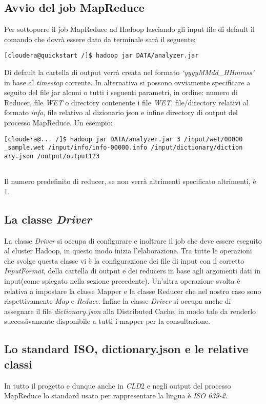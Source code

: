 \documentclass{article}
\newcommand{\MR}{MapReduce}
\newcommand{\cld}{\textit{CLD}2}
\newcommand{\WET}{\textit{WET}}
\newcommand{\info}{\textit{info}}
\newcommand{\filename}[1]{\textit{#1}}
\begin{document}
\subsection{Avvio del job \MR{}}
Per sottoporre il job \MR{} ad Hadoop lasciando gli input file di default il comando che dovrà essere dato da terminale sarà il seguente:
\begin{verbatim}
[cloudera@quickstart /]$ hadoop jar DATA/analyzer.jar

\end{verbatim}
Di default la cartella di output verrà creata nel formato \textit{`yyyyMMdd\_HHmmss'} in base al \textit{timestap} corrente.
In alternativa si possono ovviamente specificare a seguito del file jar alcuni o tutti i seguenti parametri, in ordine: numero di Reducer, file \WET{} o directory contenente i file \WET{}, file/directory relativi al formato \info{}, file relativo al dizionario json e infine directory di output del processo \MR{}. Un esempio:
\begin{verbatim}
[cloudera@... /]$ hadoop jar DATA/analyzer.jar 3 /input/wet/00000
_sample.wet /input/info/info-00000.info /input/dictionary/diction
ary.json /output/output123
                                
\end{verbatim}
Il numero predefinito di reducer, se non verrà altrimenti specificato altrimenti, è 1.

\subsection{La classe \textit{Driver}}
La classe \filename{Driver} si occupa di configurare e inoltrare il job che deve essere eseguito al cluster Hadoop, in questo modo inizia l'elaborazione. Tra tutte le operazioni che svolge questa classe vi è la configurazione dei file di input con il corretto \textit{InputFormat}, della cartella di output e dei reducers in base agli argomenti dati in input(come spiegato nella sezione precedente). Un'altra operazione svolta è relativa a impostare la classe Mapper e la classe Reducer che nel nostro caso sono rispettivamente \filename{Map} e \filename{Reduce}. Infine la classe \filename{Driver} si occupa anche di assegnare il file \filename{dictionary.json} alla Distributed Cache, in modo tale da renderlo successivamente disponibile a tutti i mapper per la consultazione.

\subsection{Lo standard ISO, dictionary.json e le relative classi}
In tutto il progetto e dunque anche in \cld{} e negli output del processo \MR{} lo standard usato per rappresentare la lingua è \textit{ISO 639-2}.
\end{document}

